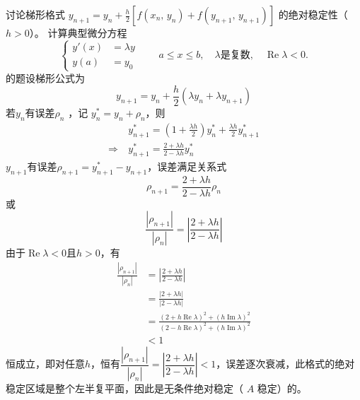 \documentclass[11pt]{article}
\begin{document}
\begin{question}
    \questiontext
    {
        讨论梯形格式 $y_{n + 1} = y_{n} + \displaystyle \frac{h}{2}\left[f(x_{n},\, y_{n}) + f(y_{n + 1},\, y_{n + 1})\right]$ 的绝对稳定性（$h > 0$）。
    }
    \answer
    {
        计算典型微分方程
        \begin{equation*}
            \left\{
            \begin{aligned}
                y'(x) & = \lambda y \\
                y(a)  & = y_0
            \end{aligned}
            \right.
            \qquad a \leqslant x \leqslant b,\quad \lambda \text{是复数},\quad \operatorname{Re} \lambda < 0.
        \end{equation*}
        的题设梯形公式为
        \begin{equation*}
            y_{n + 1} = y_{n} + \frac{h}{2}\left(\lambda y_{n} + \lambda y_{n + 1}\right)
        \end{equation*}
        若$y_{n}$有误差$\rho_{n}$ ，记 $y_{n}^* = y_{n} + \rho_{n}$，则
        \begin{align*}
                          & y_{n + 1}^* = \left(1 + \frac{\lambda h}{2}\right)y_{n}^* + \frac{\lambda h}{2}y_{n + 1}^* \\
            \Rightarrow\  & y_{n + 1}^* = \frac{2 + \lambda h}{2 - \lambda h}y_{n}^*
        \end{align*}
        $y_{n + 1}$有误差$\rho_{n + 1} = y_{n + 1}^* - y_{n + 1}$，误差满足关系式
        \begin{equation*}
            \rho_{n + 1} = \frac{2 + \lambda h}{2 - \lambda h}\rho_{n}
        \end{equation*}
        或
        \begin{equation*}
            \frac{|\rho_{n + 1}|}{|\rho_{n}|} = \left|\frac{2 + \lambda h}{2 - \lambda h}\right|
        \end{equation*}
        由于$\operatorname{Re} \lambda < 0$且$h > 0$，有
        \begin{align*}
            \frac{|\rho_{n + 1}|}{|\rho_{n}|} & = \left|\frac{2 + \lambda h}{2 - \lambda h}\right|                                                                                                    \\
                                              & = \frac{\left|2 + \lambda h\right|}{\left|2 - \lambda h\right|}                                                                                       \\
                                              & = \frac{(2 + h\operatorname{Re} \lambda )^2 + (h\operatorname{Im} \lambda )^2}{(2 - h\operatorname{Re} \lambda )^2 + (h\operatorname{Im} \lambda )^2} \\
                                              & < 1
        \end{align*}
        恒成立，即对任意$h$，恒有$\dfrac{|\rho_{n + 1}|}{|\rho_{n}|} = \left|\dfrac{2 + \lambda h}{2 - \lambda h}\right| < 1$，误差逐次衰减，此格式的绝对稳定区域是整个左半复平面，因此是无条件绝对稳定（ $A$ 稳定）的。
    }
\end{question}
\end{document}
